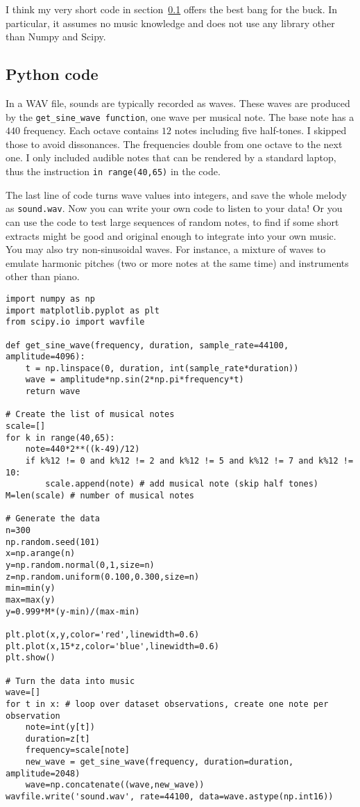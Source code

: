 \documentclass[oneside,10pt]{book}
\begin{document}
I think my very short code in section~\ref{cvbxc} offers the best bang for the buck. In particular, it assumes no music knowledge and does not use any library other than Numpy and Scipy.

\subsection{Python code}\label{cvbxc}

In a WAV file, sounds are typically recorded as waves. These waves are produced by the \texttt{get\_sine\_wave function}, one wave per musical note. The base note has a $440$ frequency. Each octave contains $12$ notes including five half-tones. I skipped those to avoid dissonances. The frequencies double from one octave to the next one. I only included audible notes that can be rendered by a standard laptop, thus the instruction \texttt{in range(40,65)} in the code.

The last line of code turns wave values into integers, and save the whole melody as \texttt{sound.wav}. Now you can write your own code to listen to your data! Or you can use the code to test large sequences of random notes, to find if some short extracts might be good and original enough to integrate into your own music. You may also try non-sinusoidal waves. For instance, a mixture of waves to emulate harmonic pitches (two or more notes at the same time) and instruments other than piano. \\



\begin{lstlisting}
import numpy as np
import matplotlib.pyplot as plt
from scipy.io import wavfile

def get_sine_wave(frequency, duration, sample_rate=44100, amplitude=4096):
    t = np.linspace(0, duration, int(sample_rate*duration))
    wave = amplitude*np.sin(2*np.pi*frequency*t)
    return wave

# Create the list of musical notes
scale=[]
for k in range(40,65):
    note=440*2**((k-49)/12)
    if k%12 != 0 and k%12 != 2 and k%12 != 5 and k%12 != 7 and k%12 != 10:
        scale.append(note) # add musical note (skip half tones)
M=len(scale) # number of musical notes

# Generate the data
n=300
np.random.seed(101)
x=np.arange(n)
y=np.random.normal(0,1,size=n)
z=np.random.uniform(0.100,0.300,size=n)
min=min(y)
max=max(y)
y=0.999*M*(y-min)/(max-min)

plt.plot(x,y,color='red',linewidth=0.6)
plt.plot(x,15*z,color='blue',linewidth=0.6)
plt.show()

# Turn the data into music
wave=[]
for t in x: # loop over dataset observations, create one note per observation
    note=int(y[t])
    duration=z[t]
    frequency=scale[note]
    new_wave = get_sine_wave(frequency, duration=duration, amplitude=2048)
    wave=np.concatenate((wave,new_wave))
wavfile.write('sound.wav', rate=44100, data=wave.astype(np.int16))
\end{lstlisting}
\end{document}

